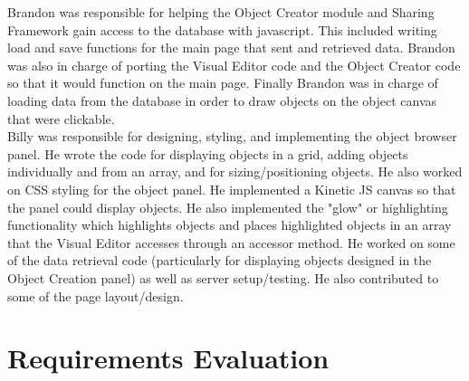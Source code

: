 \documentclass[12pt]{article}
\begin{document}
Brandon was responsible for helping the Object Creator module and Sharing Framework gain access to the database with javascript.  This included writing load and save functions for the main page that sent and retrieved data.  Brandon was also in charge of porting the Visual Editor code and the Object Creator code so that it would function on the main page.  Finally Brandon was in charge of loading data from the database in order to draw objects on the object canvas that were clickable.  \\

Billy was responsible for designing, styling, and implementing the object browser panel. He wrote the code for displaying objects in a grid, adding objects individually and from an array, and for sizing/positioning objects. He also worked on CSS styling for the object panel. He implemented a Kinetic JS canvas so that the panel could display objects. He also implemented the "glow" or highlighting functionality which highlights objects and places highlighted objects in an array that the Visual Editor accesses through an accessor method. He worked on some of the data retrieval code (particularly for displaying objects designed in the Object Creation panel) as well as server setup/testing. He also contributed to some of the page layout/design.

\section{Requirements Evaluation}
\end{document}
